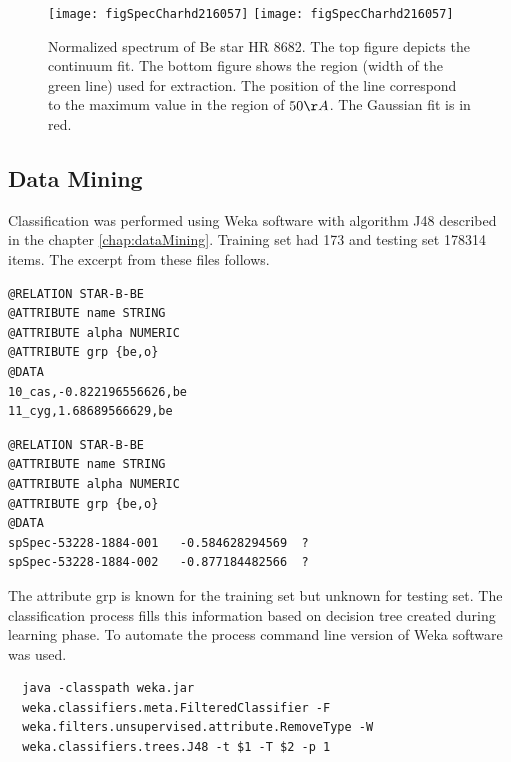    \begin{figure}[!htbp]
      \begin{center}
        \leavevmode
        \ifpdf
        \texttt{[image: figSpecCharhd216057]}
        \else
        \texttt{[image: figSpecCharhd216057]}
        \fi
        \caption{Normalized spectrum of Be star HR 8682. The top
          figure depicts the continuum fit. The bottom figure shows
          the region (width of the green line) used for
          extraction. The position of the line correspond to the
          maximum value in the region of $50\AA$. The Gaussian fit is
          in red.}
        \label{FigSpecChar}
      \end{center}
    \end{figure}


\clearpage




\subsection{Data Mining}
Classification was performed using Weka software with algorithm J48
described in the chapter \ref{chap:dataMining}. Training set had 173
and testing set 178314 items. The excerpt from these files follows.

\begin{lstlisting}
@RELATION STAR-B-BE
@ATTRIBUTE name STRING
@ATTRIBUTE alpha NUMERIC
@ATTRIBUTE grp {be,o}
@DATA
10_cas,-0.822196556626,be
11_cyg,1.68689566629,be
\end{lstlisting}

\begin{lstlisting}
@RELATION STAR-B-BE
@ATTRIBUTE name STRING
@ATTRIBUTE alpha NUMERIC
@ATTRIBUTE grp {be,o}
@DATA	 
spSpec-53228-1884-001	-0.584628294569	 ?
spSpec-53228-1884-002	-0.877184482566	 ?
\end{lstlisting}

The attribute \textrm{grp} is known for the training set but unknown
for testing set. The classification process fills this information
based on decision tree created during learning phase. To automate the
process command line version of Weka software was used.

\begin{lstlisting}
  java -classpath weka.jar
  weka.classifiers.meta.FilteredClassifier -F
  weka.filters.unsupervised.attribute.RemoveType -W
  weka.classifiers.trees.J48 -t $1 -T $2 -p 1
\end{lstlisting}

